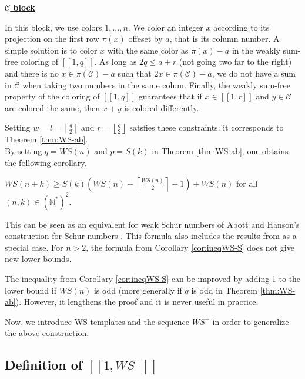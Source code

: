 \documentclass[final,onefignum,onetabnum]{siamart190516}
\newcommand{\WS}{\mathit{WS}}
\begin{document}
\noindent \underline{\textbf{\(\mathcal{C}\) block}}
\par
In this block, we use colors \(1, ..., n\). We color an integer \(x\) according to its projection on the first row \(\pi(x)\) offeset by \(a\), 
that is its column number. A simple solution is to color \(x\) with the same color as \(\pi(x) - a\) in the weakly sum-free coloring of 
\([\![1,q]\!]\). As long as \(2q \leqslant a + r\) (not going two far to the right) and there is no \(x \in \pi(\mathcal{C}) - a\) such that 
\(2x \in \pi(\mathcal{C}) - a\), we do not have a sum in \(\mathcal{C}\) when taking two numbers in the same colum. Finally, the 
weakly sum-free property of the coloring of \([\![1,q]\!]\) guarantees that if \(x \in [\![1,r]\!]\) and \(y \in \mathcal{C}\) are colored 
the same, then \(x + y\) is colored differently.

Setting \(w = l = \left\lceil \displaystyle \frac{q}{2} \right\rceil\) and \(r = \left\lfloor \displaystyle \frac{q}{2} \right\rfloor\) satsfies these 
constraints: it corresponds to Theorem \ref{thm:WS-ab}. \\

By setting \(q = \WS (n)\) and \(p = S(k)\) in Theorem \ref{thm:WS-ab}, one obtains the following corollary.

\begin{corollary}
\label{cor:ineqWS-S}
\(\WS (n+k) \geqslant S(k) \left (\WS (n) + \left \lceil \displaystyle \frac{\WS (n)}{2} \right \rceil +1 \right) + \WS (n)\)
for all \((n,k) \in (\mathbb{N}^*)^2\).
\end{corollary}

This can be seen as an equivalent for weak Schur numbers of Abott and Hanson's construction for Schur numbers 
\cite{AbbottHanson}. This formula also includes the results from \cite{RowleyWS} as a special case. For \(n>2\), 
the formula from Corollary \ref{cor:ineqWS-S} does not give new lower bounds.

\begin{remark}
The inequality from Corollary \ref{cor:ineqWS-S} can be improved by adding 1 to the lower bound if \(\WS (n)\) is odd (more generally if \(q\) is
odd in Theorem \ref{thm:WS-ab}). However, it lengthens the proof and it is never useful in practice.
\end{remark}
\par
Now, we introduce WS-templates and the sequence \(\WS^+\) in order to generalize the above construction.

\subsection{Definition of \([\![ 1, \WS^+ ]\!]\)}
\label{DefinitionWS+}
\end{document}
